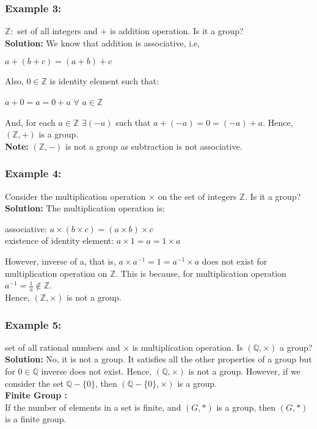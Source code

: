 \documentclass[11pt]{article}
\begin{document}
\subsubsection{Example 3:}
$\mathbb{Z: }$ set of all integers and $+$ is addition operation. Is it a group?\\
\textbf{Solution:} We know that addition is associative, i.e, 
\begin{center}
    $a + (b + c) = (a + b) + c$\\
\end{center}
Also, $0 \in \mathbb{Z}$ is identity element such that:
\begin{center}
    $a + 0 = a = 0 + a$ $\forall$ $a \in \mathbb{Z}$
\end{center}
And, for each $a \in \mathbb{Z}$ $\exists (-a)$ such that $a + (-a) = 0 = (-a) + a$. Hence, $(\mathbb{Z}, +)$ is a group.\\
\vspace{3mm}
\textbf{Note:} $(\mathbb{Z}, -)$ is not a group as subtraction is not associative.\\

\subsubsection{Example 4:}
Consider the multiplication operation $\times$ on the set of integers $\mathbb{Z}$. Is it a group?\\
\textbf{Solution:} The multiplication operation is:
\begin{center}
    associative: $a \times (b \times c) = (a \times b) \times c$\\
    existence of identity element: $a \times 1 = a = 1 \times a$
\end{center}
However, inverse of a, that is, $a \times a^{-1} = 1 = a^{-1} \times a$ does not exist for multiplication operation on $\mathbb{Z}$. This is because, for multiplication operation $a^{-1} = \frac{1}{a} \notin \mathbb{Z}$. \\Hence, $(\mathbb{Z}, \times)$ is not a group.\\

\subsubsection{Example 5:}
set of all rational numbers and $\times$ is multiplication operation. Is $(\mathbb{Q}, \times)$ a group?\\
\textbf{Solution:} No, it is not a group. It satisfies all the other properties of a group but for $0 \in \mathbb{Q}$ inverse does not exist. Hence, $(\mathbb{Q}, \times)$ is not a group. However, if we consider the set $\mathbb{Q} - \{0\}$, then $(\mathbb{Q} - \{0\}, \times)$ is a group.\\
\vspace{3mm}
\textbf{Finite Group :}\\
If the number of elements in a set is finite, and $(G, *)$ is a group, then $(G, *)$ is a finite group.\\
\vspace{3mm}
\end{document}
